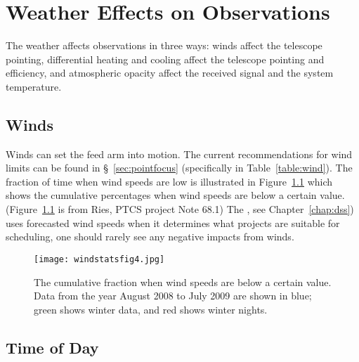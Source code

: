 \chapter{Weather Effects on Observations}\label{chap:weather}

\vspace{-1cm}
The weather affects observations in three ways:  winds affect the telescope 
pointing, differential heating and cooling affect the telescope pointing and 
efficiency, and atmospheric opacity affect the received signal and the 
system temperature. 

\section{Winds}

Winds can set the feed arm into motion.  The current recommendations for wind limits
can be found in \S~\ref{sec:pointfocus} (specifically in Table~\ref{table:wind}).
The fraction of time when wind speeds are low is illustrated in  
Figure~\ref{fig:windspeed} which shows the cumulative percentages when 
wind speeds are below a certain value.  
(Figure~\ref{fig:windspeed} is from Ries, PTCS project Note 68.1)
The , see Chapter~\ref{chap:dss}) uses forecasted wind speeds when it
determines what projects are suitable for scheduling, one should rarely see any
negative impacts from winds.

\begin{figure}[!h]
\begin{center}
\texttt{[image: windstatsfig4.jpg]}
\caption[Wind speed statistics]{The cumulative fraction when wind speeds are 
below a certain value. Data from the year August 2008 to July 2009 are shown
in blue;  green shows winter data, and red shows winter nights.
\label{fig:windspeed}}
\end{center}
\end{figure}

\newpage

\section{Time of Day}

